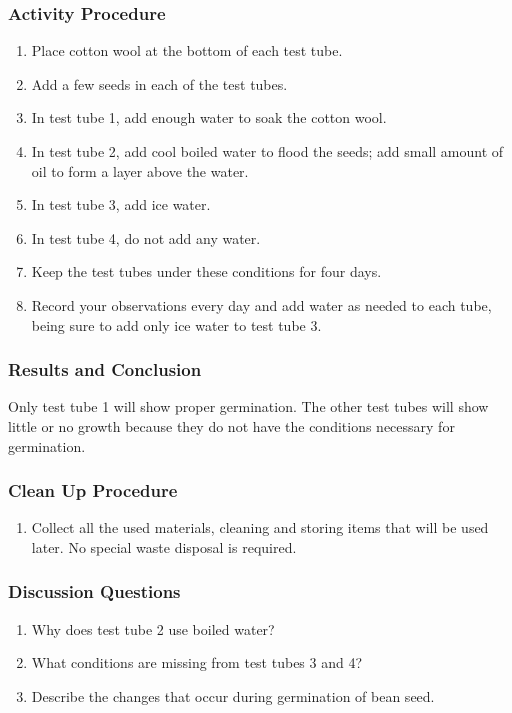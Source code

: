 \subsubsection*{Activity Procedure}
\begin{enumerate}
\item{Place cotton wool at the bottom of each test tube.}
\item{Add a few seeds in each of the test tubes.}
\item{In test tube 1, add enough water to soak the cotton wool.}
\item{In test tube 2, add cool boiled water to flood the seeds; add small amount of oil to form a layer above the water.}
\item{In test tube 3, add ice water.}
\item{In test tube 4, do not add any water.}
\item{Keep the test tubes under these conditions for four days.}
\item{Record your observations every day and add water as needed to each tube, being sure to add only ice water to test tube 3.}
\end{enumerate}

\subsubsection*{Results and Conclusion}
Only test tube 1 will show proper germination. The other test tubes will show little or no growth because they do not have the conditions necessary for germination.

\subsubsection*{Clean Up Procedure}
\begin{enumerate}
\item{Collect all the used materials, cleaning and storing items that will be used later. No special waste disposal is required.}
\end{enumerate}

\subsubsection*{Discussion Questions}
\begin{enumerate}
\item{Why does test tube 2 use boiled water?}
\item{What conditions are missing from test tubes 3 and 4?}
\item{Describe the changes that occur during germination of bean seed.}
\end{enumerate}

